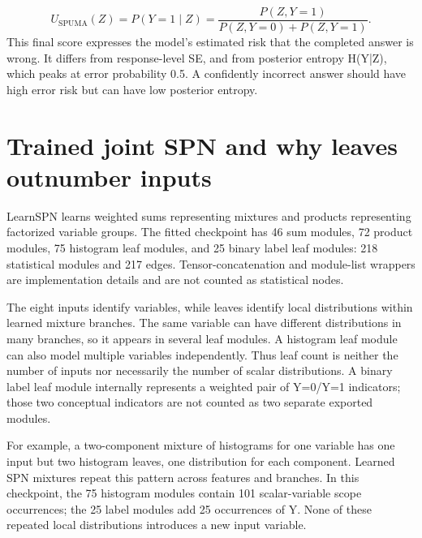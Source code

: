 \documentclass[11pt,a4paper]{article}
\begin{document}
\begin{equation*}
U_{\mathrm{SPUMA}}(Z)=P(Y=1\mid Z)=\frac{P(Z,Y=1)}{P(Z,Y=0)+P(Z,Y=1)}.
\end{equation*}
This final score expresses the model's estimated risk that the completed answer is wrong. It differs from response-level SE, and from posterior entropy H(Y|Z), which peaks at error probability 0.5. A confidently incorrect answer should have high error risk but can have low posterior entropy.

\section{Trained joint SPN and why leaves outnumber inputs}
LearnSPN learns weighted sums representing mixtures and products representing factorized variable groups. The fitted checkpoint has 46 sum modules, 72 product modules, 75 histogram leaf modules, and 25 binary label leaf modules: 218 statistical modules and 217 edges. Tensor-concatenation and module-list wrappers are implementation details and are not counted as statistical nodes.

The eight inputs identify variables, while leaves identify local distributions within learned mixture branches. The same variable can have different distributions in many branches, so it appears in several leaf modules. A histogram leaf module can also model multiple variables independently. Thus leaf count is neither the number of inputs nor necessarily the number of scalar distributions. A binary label leaf module internally represents a weighted pair of Y=0/Y=1 indicators; those two conceptual indicators are not counted as two separate exported modules.

For example, a two-component mixture of histograms for one variable has one input but two histogram leaves, one distribution for each component. Learned SPN mixtures repeat this pattern across features and branches. In this checkpoint, the 75 histogram modules contain 101 scalar-variable scope occurrences; the 25 label modules add 25 occurrences of Y. None of these repeated local distributions introduces a new input variable.
\end{document}
